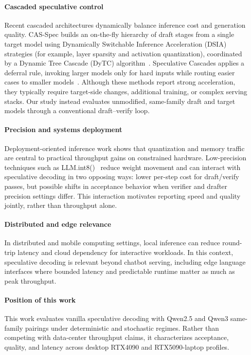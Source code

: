 \paragraph{Cascaded speculative control}
Recent cascaded architectures dynamically balance inference cost and generation
quality. CAS-Spec builds an on-the-fly hierarchy of draft stages from a single
target model using Dynamically Switchable Inference Acceleration (DSIA)
strategies (for example, layer sparsity and activation quantization),
coordinated by a Dynamic Tree Cascade (DyTC) algorithm~\cite{Ning2025CASSpec}.
Speculative Cascades applies a deferral rule, invoking larger models only for
hard inputs while routing easier cases to smaller models~\cite{Narasimhan2024FasterCascades}.
Although these methods report strong acceleration, they typically require
target-side changes, additional training, or complex serving stacks. Our
study instead evaluates unmodified, same-family draft and target models
through a conventional draft--verify loop.

\paragraph{Precision and systems deployment}
Deployment-oriented inference work shows that quantization and memory traffic
are central to practical throughput gains on constrained hardware.
Low-precision techniques such as LLM.int8()~\cite{Dettmers2022Int8} reduce
weight movement and can interact with speculative decoding in two opposing
ways: lower per-step cost for draft/verify passes, but possible shifts in
acceptance behavior when verifier and drafter precision settings differ.
This interaction motivates reporting speed and quality jointly, rather than
throughput alone.

\paragraph{Distributed and edge relevance}
In distributed and mobile computing settings, local inference can reduce
round-trip latency and cloud dependency for interactive workloads. In this
context, speculative decoding is relevant beyond chatbot serving, including
edge language interfaces where bounded latency and predictable runtime matter
as much as peak throughput.

\paragraph{Position of this work}
This work evaluates vanilla speculative decoding with Qwen2.5 and Qwen3
same-family pairings under deterministic and stochastic regimes. Rather than
competing with data-center throughput claims, it characterizes acceptance,
quality, and latency across desktop RTX4090 and RTX5090-laptop profiles.
